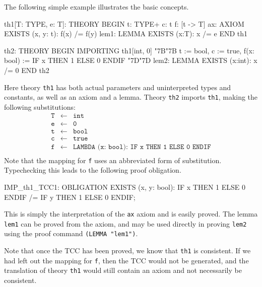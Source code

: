 \documentclass[11pt,twoside,openright,titlepage]{cslreport}
\def\mapb{\char"7B\char"7B}
\def\mape{\char"7D\char"7D}
\begin{document}
The following simple example illustrates the
basic concepts.
\begin{session}
th1[T: TYPE, e: T]: THEORY
 BEGIN
  t: TYPE+
  c: t
  f: [t -> T]
  ax: AXIOM EXISTS (x, y: t): f(x) /= f(y)
  lem1: LEMMA EXISTS (x:T): x /= e
 END th1
\end{session}
\begin{session}
th2: THEORY
 BEGIN
  IMPORTING th1[int, 0]
               \mapb{} t := bool,
                  c := true,
                  f(x: bool) := IF x THEN 1 ELSE 0 ENDIF \mape{}
  lem2: LEMMA EXISTS (x:int): x /= 0
 END th2
\end{session}
\noindent Here theory \texttt{th1} has both actual parameters and
uninterpreted types and constants, as well as an axiom and
a lemma.  Theory \texttt{th2} imports \texttt{th1}, making the
following substitutions:
\setlength{\jot}{-2pt}
\setlength{\abovedisplayskip}{0pt}
\setlength{\belowdisplayskip}{0pt}
{\smaller\begin{eqnarray*}
\texttt{T} & \leftarrow & \texttt{int} \\
\texttt{e} & \leftarrow & \texttt{0} \\
\texttt{t} & \leftarrow & \texttt{bool} \\
\texttt{c} & \leftarrow & \texttt{true} \\
\texttt{f} & \leftarrow & \texttt{LAMBDA (x:\ bool):\ IF x THEN 1 ELSE 0 ENDIF} \\
\end{eqnarray*}}
Note that the mapping for \texttt{f} uses an abbreviated form of
substitution.  Typechecking this leads to the following proof obligation.
\begin{session}
IMP_th1_TCC1: OBLIGATION
  EXISTS (x, y: bool):
    IF x THEN 1 ELSE 0 ENDIF /= IF y THEN 1 ELSE 0 ENDIF;
\end{session}
This is simply the interpretation of the \texttt{ax} axiom and is easily
proved.  The lemma \texttt{lem1} can be proved from the axiom, and may
be used directly in proving \texttt{lem2} using the proof command
\texttt{(LEMMA "lem1")}.

Note that once the TCC has been proved, we know that \texttt{th1} is
consistent.  If we had left out the mapping for \texttt{f}, then the TCC
would not be generated, and the translation of theory \texttt{th1} would
still contain an axiom and not necessarily be consistent.

\end{document}
